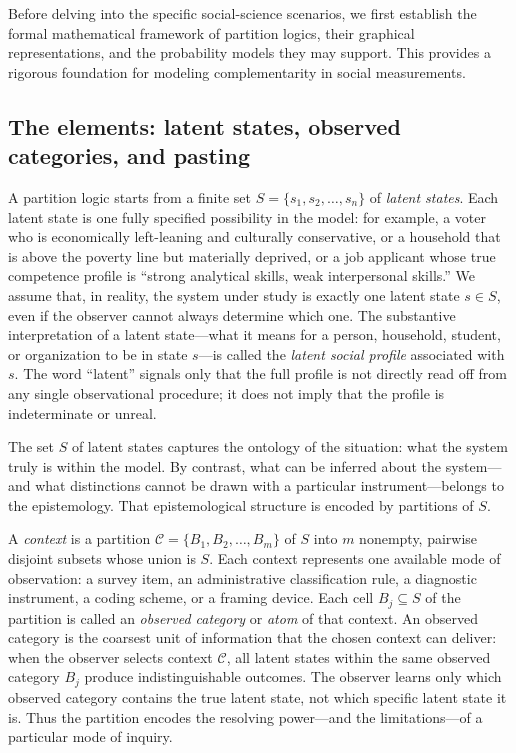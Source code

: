 \documentclass{article}
\begin{document}
Before delving into the specific social-science scenarios, we first
establish the formal mathematical framework of partition logics,
their graphical representations, and the probability models they may
support. This provides a rigorous foundation for modeling
complementarity in social measurements.

\subsection{The elements: latent states, observed categories, and pasting}

A partition logic starts from a finite set
$S = \{s_1, s_2, \ldots, s_n\}$ of \emph{latent states}.
Each latent state is one fully specified possibility in the model:
for example, a voter who is economically left-leaning and culturally
conservative, or a household that is above the poverty line but
materially deprived, or a job applicant whose true competence profile
is ``strong analytical skills, weak interpersonal skills.'' We assume
that, in reality, the system under study is exactly one latent state
$s \in S$, even if the observer cannot always determine which one.
The substantive interpretation of a latent state---what it means for
a person, household, student, or organization to be in state $s$---is
called the \emph{latent social profile} associated with $s$. The word
``latent'' signals only that the full profile is not directly read
off from any single observational procedure; it does not imply that
the profile is indeterminate or unreal.

The set $S$ of latent states captures the ontology of the situation:
what the system truly is within the model. By contrast, what can be
inferred about the system---and what distinctions cannot be drawn
with a particular instrument---belongs to the epistemology. That
epistemological structure is encoded by partitions of $S$.

A \emph{context} is a partition
$\mathcal{C} = \{B_1, B_2, \ldots, B_m\}$ of $S$ into $m$
nonempty, pairwise disjoint subsets whose union is $S$. Each context
represents one available mode of observation: a survey item, an
administrative classification rule, a diagnostic instrument, a
coding scheme, or a framing device. Each cell $B_j \subseteq S$ of
the partition is called an \emph{observed category} or \emph{atom}
of that context. An observed category is the coarsest unit of
information that the chosen context can deliver: when the observer
selects context $\mathcal{C}$, all latent states within the same
observed category $B_j$ produce indistinguishable outcomes. The
observer learns only which observed category contains the true
latent state, not which specific latent state it is. Thus the
partition encodes the resolving power---and the limitations---of a
particular mode of inquiry.
\end{document}
